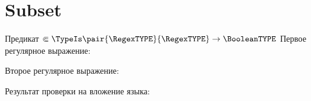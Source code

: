 \section{Subset}
\begin{frame}{Предикат $\Subset\TypeIs\pair{\RegexTYPE}{\RegexTYPE}\to\BooleanTYPE$}
	Первое регулярное выражение:

	Второе регулярное выражение:

	Результат проверки на вложение языка:

\end{frame}
